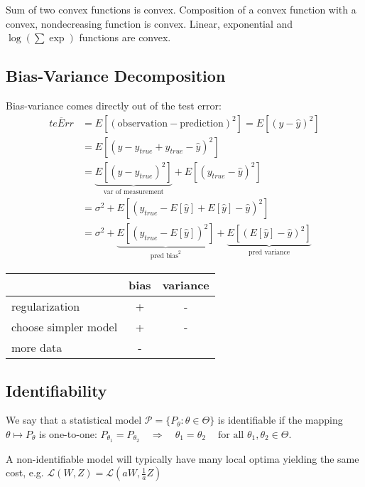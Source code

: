 \documentclass[10pt,a4paper,landscape]{article}
\begin{document}
\begin{multicols*}{4}
Sum of two convex functions is convex. Composition of a convex function with a convex, nondecreasing function is convex. Linear, exponential and $\log(\sum \exp)$ functions are convex.

\subsection{Bias-Variance Decomposition}

Bias-variance comes directly out of the test error:
 \begin{align*}
 \overline{teErr}
 &= E[(\text{observation} - \text{prediction})^2] = E[(y - \hat{y})^2] \\
 &= E[(y - y_{true} + y_{true} - \hat{y})^2] \\
 &=\underbrace{E[(y - y_{true})^2]}_{\text{var of measurement}} + E[(y_{true} - \hat{y})^2] \\
 &=\sigma^2 + E[(y_{true} - E[\hat{y}] + E[\hat{y}] - \hat{y})^2] \\
 &=\sigma^2 + \underbrace{E[(y_{true} - E[\hat{y}])^2]}_{\text{pred bias}^2} +\underbrace{E[(E[\hat{y}] - \hat{y})^2]}_{\text{pred variance}}
\end{align*}

\begin{tabular}{ l || c | c }
                          & bias & variance \\
  \hline
  regularization          & +    & - \\
  choose simpler model    & +    & - \\
  more data               & -    & \\
  \hline
\end{tabular}

\subsection{Identifiability}
We say that a statistical model $\mathcal{P} = \{P_\theta: \theta \in \Theta\}$ is identifiable if the mapping $\theta \mapsto P_\theta$ is one-to-one:
$P_{\theta_1}=P_{\theta_2} \quad\Rightarrow\quad \theta_1=\theta_2 \quad\ \text{for all } \theta_1,\theta_2\in\Theta.$

A non-identifiable model will typically have many local optima yielding the same cost, e.g. $\mathcal{L}(W, Z) = \mathcal{L}(aW, \frac{1}{a} Z)$


\end{multicols*}
\end{document}
